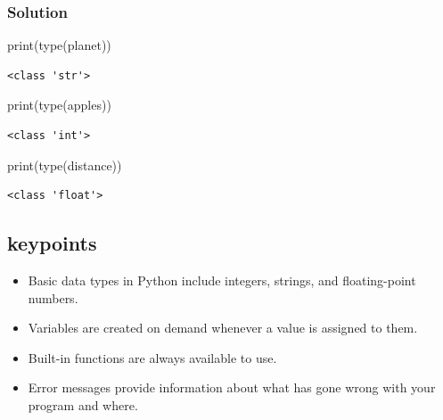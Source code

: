 \documentclass[
  letterpaper,
  DIV=11,
  numbers=noendperiod]{scrartcl}
\newenvironment{Shaded}{\begin{snugshade}}{\end{snugshade}}
\newcommand{\BuiltInTok}[1]{\textcolor[rgb]{0.00,0.23,0.31}{#1}}
\newcommand{\NormalTok}[1]{\textcolor[rgb]{0.00,0.23,0.31}{#1}}
\providecommand{\tightlist}{%
  \setlength{\itemsep}{0pt}\setlength{\parskip}{0pt}}
\begin{document}
\subsubsection{Solution}

\begin{Shaded}
\begin{Highlighting}[]
\BuiltInTok{print}\NormalTok{(}\BuiltInTok{type}\NormalTok{(planet))}
\end{Highlighting}
\end{Shaded}

\begin{verbatim}
<class 'str'>
\end{verbatim}

\begin{Shaded}
\begin{Highlighting}[]
\BuiltInTok{print}\NormalTok{(}\BuiltInTok{type}\NormalTok{(apples))}
\end{Highlighting}
\end{Shaded}

\begin{verbatim}
<class 'int'>
\end{verbatim}

\begin{Shaded}
\begin{Highlighting}[]
\BuiltInTok{print}\NormalTok{(}\BuiltInTok{type}\NormalTok{(distance))}
\end{Highlighting}
\end{Shaded}

\begin{verbatim}
<class 'float'>
\end{verbatim}

\subsection{keypoints}\label{keypoints}

\begin{itemize}
\tightlist
\item
  Basic data types in Python include integers, strings, and
  floating-point numbers.
\item
  Variables are created on demand whenever a value is assigned to them.
\item
  Built-in functions are always available to use.
\item
  Error messages provide information about what has gone wrong with your
  program and where.
\end{itemize}
\end{document}

